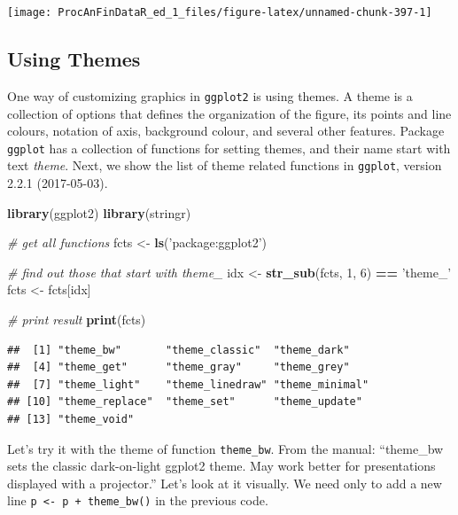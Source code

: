 \documentclass[11pt,]{book}
\newenvironment{Shaded}{\begin{snugshade}}{\end{snugshade}}
\newcommand{\KeywordTok}[1]{\textcolor[rgb]{0.27,0.27,0.27}{\textbf{#1}}}
\newcommand{\DecValTok}[1]{\textcolor[rgb]{0.06,0.06,0.06}{#1}}
\newcommand{\StringTok}[1]{\textcolor[rgb]{0.5,0.5,0.5}{#1}}
\newcommand{\CommentTok}[1]{\textcolor[rgb]{0.56,0.35,0.01}{\textit{#1}}}
\newcommand{\OperatorTok}[1]{\textcolor[rgb]{0.81,0.36,0.00}{\textbf{#1}}}
\newcommand{\NormalTok}[1]{#1}
\begin{document}
\begin{center}\texttt{[image: ProcAnFinDataR\_ed\_1\_files/figure-latex/unnamed-chunk-397-1]} \end{center}

\subsection{Using Themes}\label{using-themes}

One way of customizing graphics in \texttt{ggplot2} is using themes. A
theme is a collection of options that defines the organization of the
figure, its points and line colours, notation of axis, background
colour, and several other features. Package \texttt{ggplot} has a
collection of functions for setting themes, and their name start with
text \emph{theme}. Next, we show the list of theme related functions in
\texttt{ggplot}, version 2.2.1 (2017-05-03).

\begin{Shaded}
\begin{Highlighting}[]
\KeywordTok{library}\NormalTok{(ggplot2)}
\KeywordTok{library}\NormalTok{(stringr)}

\CommentTok{# get all functions}
\NormalTok{fcts <-}\StringTok{ }\KeywordTok{ls}\NormalTok{(}\StringTok{'package:ggplot2'}\NormalTok{)}

\CommentTok{# find out those that start with theme_}
\NormalTok{idx <-}\StringTok{ }\KeywordTok{str_sub}\NormalTok{(fcts, }\DecValTok{1}\NormalTok{, }\DecValTok{6}\NormalTok{) }\OperatorTok{==}\StringTok{ 'theme_'}
\NormalTok{fcts <-}\StringTok{ }\NormalTok{fcts[idx]}

\CommentTok{# print result}
\KeywordTok{print}\NormalTok{(fcts)}
\end{Highlighting}
\end{Shaded}

\begin{verbatim}
##  [1] "theme_bw"       "theme_classic"  "theme_dark"    
##  [4] "theme_get"      "theme_gray"     "theme_grey"    
##  [7] "theme_light"    "theme_linedraw" "theme_minimal" 
## [10] "theme_replace"  "theme_set"      "theme_update"  
## [13] "theme_void"
\end{verbatim}

Let's try it with the theme of function \texttt{theme\_bw}. From the
manual: ``theme\_bw sets the classic dark-on-light ggplot2 theme. May
work better for presentations displayed with a projector.'' Let's look
at it visually. We need only to add a new line
\texttt{p\ \textless{}-\ p\ +\ theme\_bw()} in the previous code.
\end{document}
